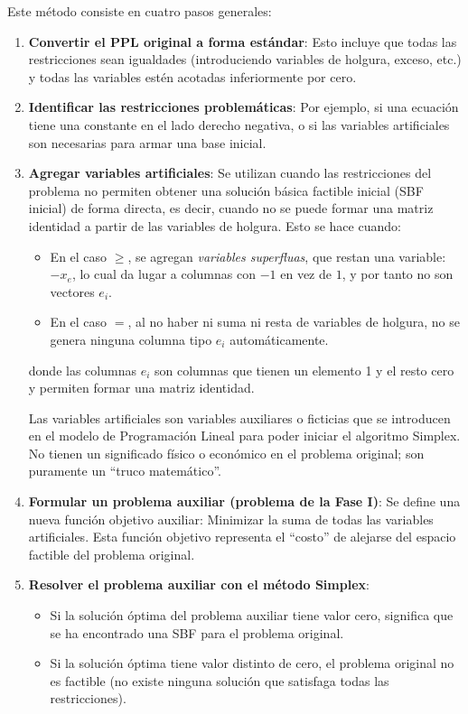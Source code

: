 Este método consiste en cuatro pasos generales:
\begin{enumerate}

  \item \textbf{Convertir el PPL original a forma estándar}: Esto incluye que todas las restricciones sean igualdades (introduciendo variables de holgura, exceso, etc.) y todas las variables estén acotadas inferiormente por cero.

  \item \textbf{Identificar las restricciones problemáticas}: Por ejemplo, si una ecuación tiene una constante en el lado derecho negativa, o si las variables artificiales son necesarias para armar una base inicial.

  \item \textbf{Agregar variables artificiales}: Se utilizan cuando las restricciones del problema no permiten obtener una solución básica factible inicial (SBF inicial) de forma directa, es decir, cuando no se puede formar una matriz identidad a partir de las variables de holgura. Esto se hace cuando:
    \begin{itemize}
      \item En el caso \(\geq\), se agregan \textit{variables superfluas}, que restan una variable: \(-x_e\), lo cual da lugar a columnas con \(-1\) en vez de \(1\), y por tanto no son vectores \(e_i\).
      \item En el caso \(=\), al no haber ni suma ni resta de variables de holgura, no se genera ninguna columna tipo \(e_i\) automáticamente.
    \end{itemize}
    donde las columnas \(e_i\) son columnas que tienen un elemento 1 y el resto cero y permiten formar una matriz identidad.
  \begin{tcolorbox}[myconclusion]
    Las variables artificiales son variables auxiliares o ficticias que se introducen en el modelo de Programación Lineal para poder iniciar el algoritmo Simplex. No tienen un significado físico o económico en el problema original; son puramente un ``truco matemático''.
  \end{tcolorbox}

  \item \textbf{Formular un problema auxiliar (problema de la Fase I)}: Se define una nueva función objetivo auxiliar: Minimizar la suma de todas las variables artificiales. Esta función objetivo representa el “costo” de alejarse del espacio factible del problema original.

  \item \textbf{Resolver el problema auxiliar con el método Simplex}: 
  \begin{itemize}
    \item Si la solución óptima del problema auxiliar tiene valor cero, significa que se ha encontrado una SBF para el problema original.
    \item Si la solución óptima tiene valor distinto de cero, el problema original no es factible (no existe ninguna solución que satisfaga todas las restricciones).
  \end{itemize}


\end{enumerate}

